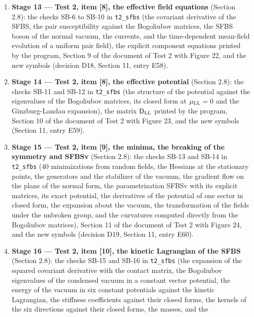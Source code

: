 \documentclass[
  10pt,
]{article}
\begin{document}
\begin{enumerate}
  (\texttt{test2/python/make\_t2\_sfbs\_figures.py}), the new symbols,
  and \texttt{check\_all.sh} extended (decision D17, Section 11, entry
  E57).
\item
  \textbf{Stage 13 --- Test 2, item {[}8{]}, the effective field
  equations} (Section 2.8): the checks SB-6 to SB-10 in
  \texttt{t2\_sfbs} (the covariant derivative of the SFBS, the pair
  susceptibility against the Bogoliubov matrices, the SFBS boson of the
  normal vacuum, the currents, and the time-dependent mean-field
  evolution of a uniform pair field), the explicit component equations
  printed by the program, Section 9 of the document of Test 2 with
  Figure 22, and the new symbols (decision D18, Section 11, entry E58).
\item
  \textbf{Stage 14 --- Test 2, item {[}8{]}, the effective potential}
  (Section 2.8): the checks SB-11 and SB-12 in \texttt{t2\_sfbs} (the
  structure of the potential against the eigenvalues of the Bogoliubov
  matrices, its closed form at \(\mu_{\rm LL}=0\) and the
  Ginzburg-Landau expansion), the matrix \(\mathsf D_{\rm LL}\) printed
  by the program, Section 10 of the document of Test 2 with Figure 23,
  and the new symbols (Section 11, entry E59).
\item
  \textbf{Stage 15 --- Test 2, item {[}9{]}, the minima, the breaking of
  the symmetry and SFBSv} (Section 2.8): the checks SB-13 and SB-14 in
  \texttt{t2\_sfbs} (40 minimizations from random fields, the Hessians
  at the stationary points, the generators and the stabilizer of the
  vacuum, the gradient flow on the plane of the normal form, the
  parametrization SFBSv with its explicit matrices, its exact potential,
  the derivatives of the potential of one sector in closed form, the
  expansion about the vacuum, the transformation of the fields under the
  unbroken group, and the curvatures computed directly from the
  Bogoliubov matrices), Section 11 of the document of Test 2 with Figure
  24, and the new symbols (decision D19, Section 11, entry E60).
\item
  \textbf{Stage 16 --- Test 2, item {[}10{]}, the kinetic Lagrangian of
  the SFBS} (Section 2.8): the checks SB-15 and SB-16 in
  \texttt{t2\_sfbs} (the expansion of the squared covariant derivative
  with the contact matrix, the Bogoliubov eigenvalues of the condensed
  vacuum in a constant vector potential, the energy of the vacuum in six
  constant potentials against the kinetic Lagrangian, the stiffness
  coefficients against their closed forms, the kernels of the six
  directions against their closed forms, the masses, and the

\end{enumerate}
\end{document}
